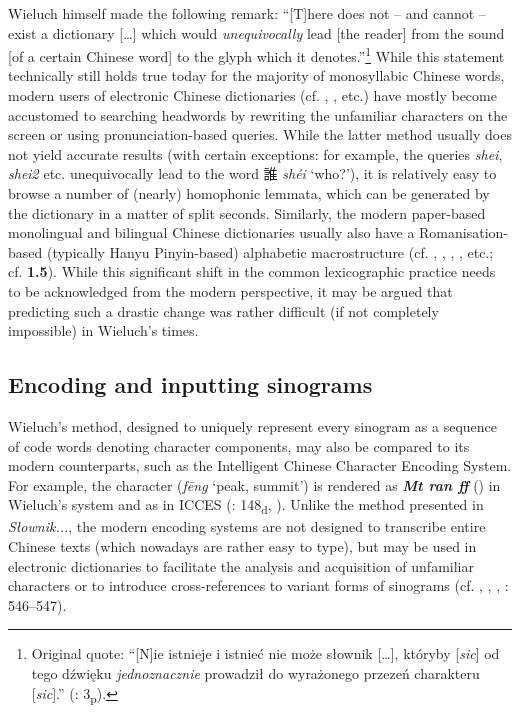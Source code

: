\documentclass[output=paper,colorlinks,citecolor=brown,arabicfont,chinesefont]{langscibook}
\begin{document}
Wieluch himself made the following remark: “[T]here does not – and cannot – exist a dictionary […] which would \emph{unequivocally} lead [the reader] from the sound [of a certain Chinese word] to the glyph which it denotes.”\footnote{Original quote: “[N]ie istnieje i istnieć nie może słownik […], któryby [\emph{sic}] od tego dźwięku \emph{jednoznacznie} prowadził do wyrażonego przezeń charakteru [\emph{sic}].” (\citealt{Wieluch1936}: 3\textsubscript{p}).}  While this statement technically still holds true today for the majority of monosyllabic Chinese words, modern users of electronic Chinese dictionaries (cf. \citealt{Achinger2023}, \citealt{[HD]}, \citealt{[MDBG]} etc.) have mostly become accustomed to searching headwords by rewriting the unfamiliar characters on the screen or using pronunciation-based queries. While the latter method usually does not yield accurate results (with certain exceptions: for example, the queries \emph{shei}, \emph{shei2} etc. unequivocally lead to the word {\cn 誰} \emph{shéi} ‘who?’), it is relatively easy to browse a number of (nearly) homophonic lemmata, which can be generated by the dictionary in a matter of split seconds. Similarly, the modern paper-based monolingual and bilingual Chinese dictionaries usually also have a Romanisation-based (typically Hanyu Pinyin-based) alphabetic macrostructure (cf. \citealt{Xia_Chen_2009},  \citealt{XuYao_2010},  \citealt{Kocyba-grychKolecka2012}, \citealt{AchingerRadziwill2015}, etc.; cf. \textbf{1.5}). While this significant shift in the common lexicographic practice needs to be acknowledged from the modern perspective, it may be argued that predicting such a drastic change was rather difficult (if not completely impossible) in Wieluch's times.

\subsection{Encoding and inputting sinograms}

Wieluch's method, designed to uniquely represent every sinogram 
as a sequence of code words denoting character components, may also be compared to its modern counterparts, such as the Intelligent Chinese Character Encoding System. For example, the character {} (\emph{fēng} ‘peak, summit’) is rendered as \textbf{\emph{Mt ran ff}} ({}) in Wieluch's system and as \textbf{{}} in ICCES (\citealt{Wieluch1936}: 148\textsubscript{d}, \citealt[546-547]{Huang_chu-ren2016}). Unlike the method presented in \emph{Słownik...}, the modern encoding systems are not designed to transcribe entire Chinese texts (which nowadays are rather easy to type), but may be used in electronic dictionaries to facilitate the analysis and acquisition of unfamiliar characters or to introduce cross-references to variant forms of sinograms (cf. \citealt{Achinger2023}, \citealt{[HD]}, \citealt{[MDBG]}, \citealt{Huang_chu-ren2016}: 546–547).
\end{document}

